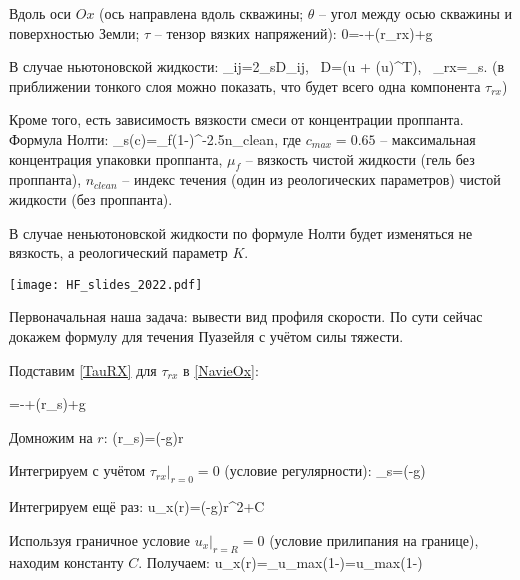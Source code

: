 \documentclass[main.tex]{subfiles}
\begin{document}
Вдоль оси $Ox$ (ось направлена вдоль скважины; $\theta$ -- угол между осью скважины и поверхностью Земли; $\tau$ -- тензор вязких напряжений):
\beq\label{NavieOx}
0=-+\left(r\tau_{rx}\right)+\rho g\sin\theta
\eeq

В случае ньютоновской жидкости:
\beq\label{TauRX}
\tau_{ij}=2\mu_sD_{ij},\,\,\,\,\,D=\left(\nabla u + (\nabla u)^T\right),\,\,\,\,\,\tau_{rx}=\mu_s.
\eeq
(в приближении тонкого слоя можно показать, что будет всего одна компонента $\tau_{rx}$)

Кроме того, есть зависимость вязкости смеси от концентрации проппанта.
Формула Нолти:
\beq
\mu_s(c)=\mu_f\left(1-\right)^{-2.5n_{clean}},
\eeq
где $c_{max}=0.65$ -- максимальная концентрация упаковки проппанта, $\mu_f$ -- вязкость чистой жидкости (гель без проппанта), $n_{clean}$ -- индекс течения (один из реологических параметров) чистой жидкости (без проппанта).

В случае неньютоновской жидкости по формуле Нолти будет изменяться не вязкость, а реологический параметр $K$.

\texttt{[image: HF\_slides\_2022.pdf]}

Первоначальная наша задача: вывести вид профиля скорости.
По сути сейчас докажем формулу для течения Пуазейля с учётом силы тяжести.

Подставим \eqref{TauRX} для $\tau_{rx}$ в \eqref{NavieOx}:

=-+\left(r\mu_s\right)+\rho g \sin{\theta}
\eeq

Домножим на $r$:
\beq
{}\left(r\mu_s\right)=\left(-\rho g\sin{\theta}\right)r
\eeq

Интегрируем с учётом $\tau_{rx}|_{r=0}=0$ (условие регулярности):
\beq
\mu_s=\left(-\rho g\sin{\theta}\right)
\eeq

Интегрируем ещё раз:
\beq
u_x(r)=\left(-\rho g\sin{\theta}\right)r^2+C
\eeq

Используя граничное условие $u_x|_{r=R}=0$ (условие прилипания на границе), находим константу $C$.
Получаем:
\beq
u_x(r)=_{u_{max}}\left(1-\right)=u_{max}\left(1-\right)
\eeq
\end{document}
